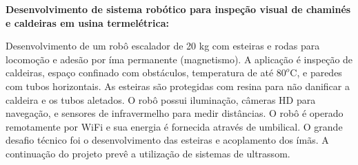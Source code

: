 
\textbf{Desenvolvimento de sistema robótico para inspeção visual de chaminés e
caldeiras em usina termelétrica:}

Desenvolvimento de um robô escalador de 20 kg com esteiras e rodas para
locomoção e adesão por íma permanente (magnetismo). A aplicação é inspeção de caldeiras,
espaço confinado com obstáculos, temperatura de até $80^o$C, e paredes com tubos
horizontais. As esteiras são protegidas com resina para não danificar a caldeira
e os tubos aletados. O robô possui iluminação, câmeras HD para navegação, e
sensores de infravermelho para medir distâncias. O robô é operado remotamente
por WiFi e sua energia é fornecida através de umbilical. O grande desafio
técnico foi o desenvolvimento das esteiras e acoplamento dos ímãs. A continuação
do projeto prevê a utilização de sistemas de ultrassom.
